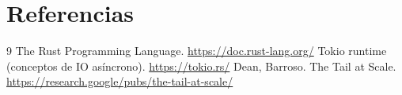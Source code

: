 \documentclass[conference]{IEEEtran}
\begin{document}
\section{Referencias}
\begin{thebibliography}{9}
 The Rust Programming Language. \url{https://doc.rust-lang.org/}
 Tokio runtime (conceptos de IO asíncrono). \url{https://tokio.rs/}
 Dean, Barroso. The Tail at Scale. \url{https://research.google/pubs/the-tail-at-scale/}
\end{thebibliography}
\end{document}
